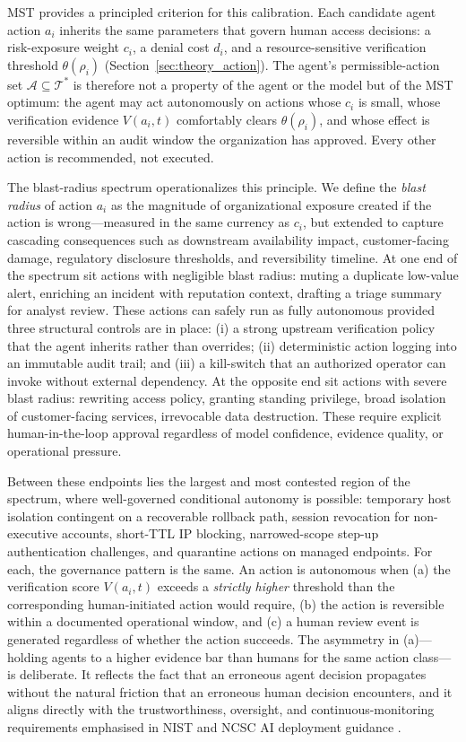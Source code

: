 \documentclass[acmlarge]{acmart}
\begin{document}
MST provides a principled criterion for this calibration. Each candidate
agent action $a_i$ inherits the same parameters that govern human access
decisions: a risk-exposure weight $c_i$, a denial cost $d_i$, and a
resource-sensitive verification threshold $\theta(\rho_i)$
(Section~\ref{sec:theory_action}). The agent's permissible-action set
$\mathcal{A} \subseteq \mathcal{T}^{*}$ is therefore not a property of the
agent or the model but of the MST optimum: the agent may act autonomously
on actions whose $c_i$ is small, whose verification evidence $V(a_i, t)$
comfortably clears $\theta(\rho_i)$, and whose effect is reversible within
an audit window the organization has approved. Every other action is
recommended, not executed.

The blast-radius spectrum operationalizes this principle. We define the
\textit{blast radius} of action $a_i$ as the magnitude of organizational
exposure created if the action is wrong---measured in the same currency as
$c_i$, but extended to capture cascading consequences such as downstream
availability impact, customer-facing damage, regulatory disclosure
thresholds, and reversibility timeline. At one end of the spectrum sit
actions with negligible blast radius: muting a duplicate low-value alert,
enriching an incident with reputation context, drafting a triage summary
for analyst review. These actions can safely run as fully autonomous
provided three structural controls are in place: (i) a strong upstream
verification policy that the agent inherits rather than overrides;
(ii) deterministic action logging into an immutable audit trail; and
(iii) a kill-switch that an authorized operator can invoke without
external dependency. At the opposite end sit actions with severe blast
radius: rewriting access policy, granting standing privilege, broad
isolation of customer-facing services, irrevocable data destruction.
These require explicit human-in-the-loop approval regardless of model
confidence, evidence quality, or operational pressure.

Between these endpoints lies the largest and most contested region of the
spectrum, where well-governed conditional autonomy is possible: temporary
host isolation contingent on a recoverable rollback path, session
revocation for non-executive accounts, short-TTL IP blocking,
narrowed-scope step-up authentication challenges, and quarantine actions
on managed endpoints. For each, the governance pattern is the same.
An action is autonomous when (a) the verification score $V(a_i, t)$
exceeds a \emph{strictly higher} threshold than the corresponding
human-initiated action would require, (b) the action is reversible within
a documented operational window, and (c) a human review event is generated
regardless of whether the action succeeds. The asymmetry in (a)---holding
agents to a higher evidence bar than humans for the same action class---is
deliberate. It reflects the fact that an erroneous agent decision
propagates without the natural friction that an erroneous human decision
encounters, and it aligns directly with the trustworthiness, oversight, and
continuous-monitoring requirements emphasised in NIST and NCSC AI
deployment guidance \cite{tabassi2023,autio2024,ncsc2023}.
\end{document}
